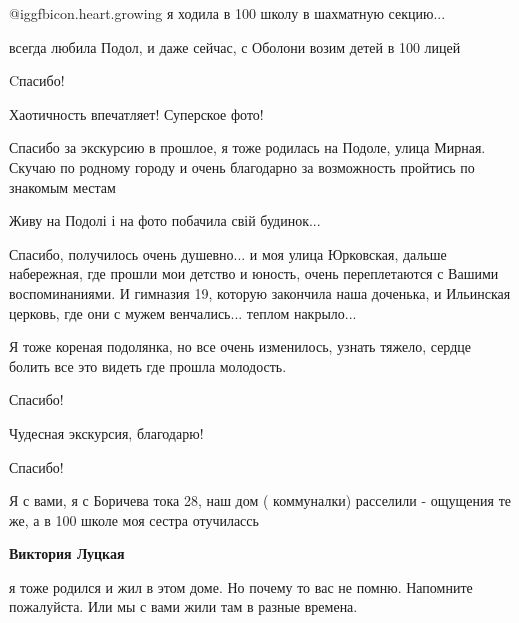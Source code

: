  
 
 
 
 

\zzSecCmt

\begin{itemize} %
 @igg{fbicon.heart.growing}  я ходила в 100 школу в шахматную секцию...

всегда любила Подол, и даже сейчас, с Оболони возим детей в 100 лицей

Cпасибо!

Хаотичность впечатляет! Суперское фото!


Спасибо за экскурсию в прошлое, я тоже родилась на Подоле, улица Мирная. Скучаю
по родному городу и очень благодарно за возможность пройтись по знакомым местам

Живу на Подолі і на фото побачила свій будинок...


Спасибо, получилось очень душевно... и моя улица Юрковская, дальше набережная,
где прошли мои детство и юность, очень переплетаются с Вашими воспоминаниями. И
гимназия 19, которую закончила наша доченька, и Ильинская церковь, где они с
мужем венчались... теплом накрыло...

Я тоже кореная подолянка, но все очень изменилось, узнать тяжело, сердце болить
все это видеть где прошла молодость.

Спасибо!

Чудесная экскурсия, благодарю!

Спасибо!


Я с вами, я с Боричева тока 28, наш дом ( коммуналки) расселили - ощущения те
же, а в 100 школе моя сестра отучилассь

\begin{itemize} %
\textbf{Виктория Луцкая} 

я тоже родился и жил в этом доме. Но почему то вас не помню. Напомните
пожалуйста. Или мы с вами жили там в разные времена.


\end{itemize}
\end{itemize}

